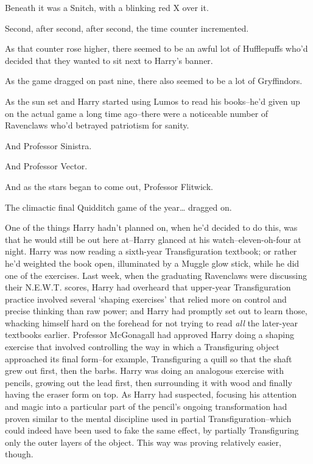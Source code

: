 Beneath it was a Snitch, with a blinking red X over it.

\later

Second, after second, after second, the time counter incremented.

As that counter rose higher, there seemed to be an awful lot of Hufflepuffs who'd decided that they wanted to sit next to Harry's banner.

As the game dragged on past nine, there also seemed to be a lot of Gryffindors.

As the sun set and Harry started using Lumos to read his books\---he'd given up on the actual game a long time ago\---there were a noticeable number of Ravenclaws who'd betrayed patriotism for sanity.

And Professor Sinistra.

And Professor Vector.

And as the stars began to come out, Professor Flitwick.

The climactic final Quidditch game of the year{\ldots} dragged on.

\later

One of the things Harry hadn't planned on, when he'd decided to do this, was that he would still be out here at\---Harry glanced at his watch\---eleven-oh-four at night. Harry was now reading a sixth-year Transfiguration textbook; or rather he'd weighted the book open, illuminated by a Muggle glow stick, while he did one of the exercises. Last week, when the graduating Ravenclaws were discussing their N.E.W.T. scores, Harry had overheard that upper-year Transfiguration practice involved several `shaping exercises' that relied more on control and precise thinking than raw power; and Harry had promptly set out to learn those, whacking himself hard on the forehead for not trying to read \emph{all} the later-year textbooks earlier. Professor McGonagall had approved Harry doing a shaping exercise that involved controlling the way in which a Transfiguring object approached its final form\---for example, Transfiguring a quill so that the shaft grew out first, then the barbs. Harry was doing an analogous exercise with pencils, growing out the lead first, then surrounding it with wood and finally having the eraser form on top. As Harry had suspected, focusing his attention and magic into a particular part of the pencil's ongoing transformation had proven similar to the mental discipline used in partial Transfiguration\---which could indeed have been used to fake the same effect, by partially Transfiguring only the outer layers of the object. This way was proving relatively easier, though.

